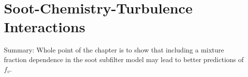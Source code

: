 \chapter{Soot-Chemistry-Turbulence Interactions\label{ch:subfilter}}

Summary: Whole point of the chapter is to show that including a mixture fraction dependence in the soot subfilter model may lead to better predictions of $f_v$.





